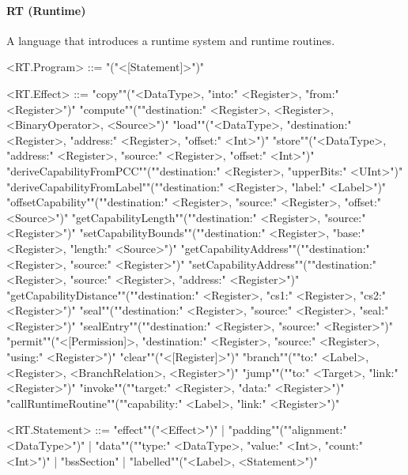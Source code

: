 \documentclass[main.tex]{subfiles}
\begin{document}
\paragraph{ RT (Runtime) } A language that introduces a runtime system and runtime routines.
\begin{grammar}
	\footnotesize
				<RT.Program> ::=
							"("<[Statement]>")"
				\par
				<RT.Effect> ::=
						"copy""("<DataType>, "into:" <Register>, "from:" <Register>")"
						\alt "compute""(""destination:" <Register>, <Register>, <BinaryOperator>, <Source>")"
						\alt "load""("<DataType>, "destination:" <Register>, "address:" <Register>, "offset:" <Int>")"
						\alt "store""("<DataType>, "address:" <Register>, "source:" <Register>, "offset:" <Int>")"
						\alt "deriveCapabilityFromPCC""(""destination:" <Register>, "upperBits:" <UInt>")"
						\alt "deriveCapabilityFromLabel""(""destination:" <Register>, "label:" <Label>")"
						\alt "offsetCapability""(""destination:" <Register>, "source:" <Register>, "offset:" <Source>")"
						\alt "getCapabilityLength""(""destination:" <Register>, "source:" <Register>")"
						\alt "setCapabilityBounds""(""destination:" <Register>, "base:" <Register>, "length:" <Source>")"
						\alt "getCapabilityAddress""(""destination:" <Register>, "source:" <Register>")"
						\alt "setCapabilityAddress""(""destination:" <Register>, "source:" <Register>, "address:" <Register>")"
						\alt "getCapabilityDistance""(""destination:" <Register>, "cs1:" <Register>, "cs2:" <Register>")"
						\alt "seal""(""destination:" <Register>, "source:" <Register>, "seal:" <Register>")"
						\alt "sealEntry""(""destination:" <Register>, "source:" <Register>")"
						\alt "permit""("<[Permission]>, "destination:" <Register>, "source:" <Register>, "using:" <Register>")"
						\alt "clear""("<[Register]>")"
						\alt "branch""(""to:" <Label>, <Register>, <BranchRelation>, <Register>")"
						\alt "jump""(""to:" <Target>, "link:" <Register>")"
						\alt "invoke""(""target:" <Register>, "data:" <Register>")"
						\alt "callRuntimeRoutine""(""capability:" <Label>, "link:" <Register>")"
				\par
				<RT.Statement> ::=
						"effect""("<Effect>")"
						| "padding""(""alignment:" <DataType>")"
						| "data""(""type:" <DataType>, "value:" <Int>, "count:" <Int>")"
						| "bssSection"
						| "labelled""("<Label>, <Statement>")"
				\par
\end{grammar}
\par
\end{document}
